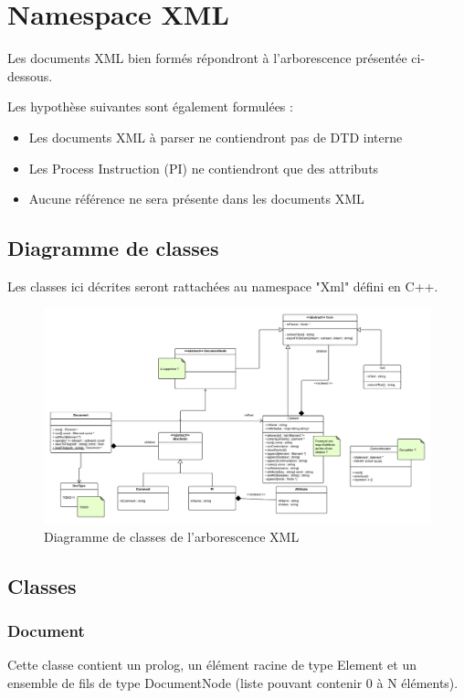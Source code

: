 \chapter{Namespace XML}

Les documents XML bien formés répondront à l'arborescence présentée ci-dessous.

Les hypothèse suivantes sont également formulées :
\begin{itemize}
    \item Les documents XML à parser ne contiendront pas de DTD interne
    \item Les Process Instruction (PI) ne contiendront que des attributs
    \item Aucune référence ne sera présente dans les documents XML\\
\end{itemize}


\section{Diagramme de classes}
    Les classes ici décrites seront rattachées au namespace "Xml" défini en C++.

    \begin{landscape}
    \begin{figure}[h!]
        \centering
        \includegraphics[width=\linewidth]{images/classDiagram.png}
        \caption{Diagramme de classes de l'arborescence XML}
        \label{classDiagram}
    \end{figure}
    \end{landscape}


\section{Classes}
    \subsection{Document}
        Cette classe contient un prolog, un élément racine de type Element et un ensemble de fils de type DocumentNode (liste pouvant contenir 0 à N éléments).


